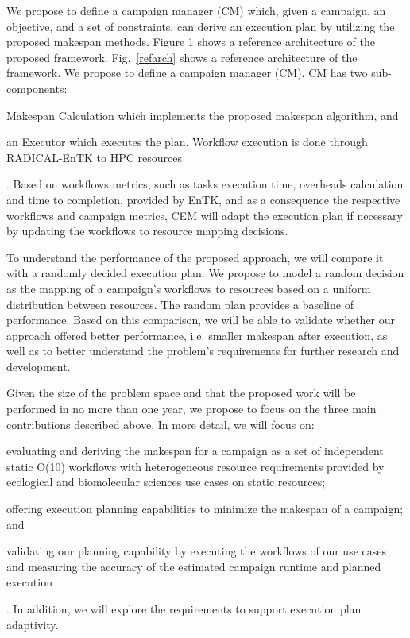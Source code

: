 We propose to define a campaign manager (CM) which, given a campaign, an objective, and a set of constraints, can derive an execution plan by utilizing the proposed makespan methods. Figure 1 shows a reference architecture of the proposed framework. Fig.~\ref{refarch} shows a reference architecture of the framework. We propose to define a campaign manager (CM). CM has two sub-components: 
\begin{inparaenum}[(1)]
\item Makespan Calculation which implements the proposed makespan algorithm, and 
\item an Executor which executes the plan. Workflow execution is done through RADICAL-EnTK to HPC resources
\end{inparaenum}.
Based on workflows metrics, such as tasks execution time, overheads calculation and time to completion, provided by EnTK,  and as a consequence the respective workflows and campaign metrics, CEM will adapt the execution plan if necessary by updating the workflows to resource mapping decisions.

To understand the performance of the proposed approach, we will compare it with a randomly decided execution plan. We propose to model a random decision as the mapping of a campaign’s workflows to resources based on a uniform distribution between resources. The random plan provides a baseline of performance. Based on this comparison, we will be able to validate whether our approach offered better performance, i.e. smaller makespan after execution, as well as to better understand the problem’s requirements for further research and development.

Given the size of the problem space and that the proposed work will be performed in no more than one year, we propose to focus on the three main contributions described above. In more detail, we will focus on: 
\begin{inparaenum}[(1)]
\item evaluating and deriving the makespan for a campaign as a set of independent static O(10) workflows with heterogeneous resource requirements provided by ecological and biomolecular sciences use cases on static resources; 
\item offering execution planning capabilities to minimize the makespan of a campaign; and 
\item validating our planning capability by executing the workflows of our use cases and measuring the accuracy of the estimated campaign runtime and planned execution
\end{inparaenum}. In addition, we will explore the requirements to support execution plan adaptivity.

